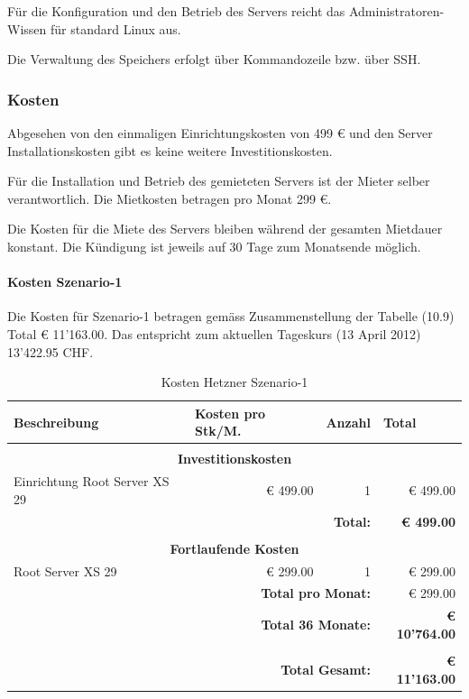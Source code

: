 Für die Konfiguration und den Betrieb des Servers reicht das Administratoren-Wissen für standard Linux aus.

Die Verwaltung des Speichers erfolgt über Kommandozeile bzw. über \gls{SSH}.

\subsubsection*{Kosten}
Abgesehen von den einmaligen Einrichtungskosten von 499 € und den Server Installationskosten gibt es keine weitere Investitionskosten. 

Für die Installation und Betrieb des gemieteten Servers ist der Mieter selber verantwortlich. Die Mietkosten betragen pro Monat 299 €.

Die Kosten für die Miete des Servers bleiben während der gesamten Mietdauer konstant. Die Kündigung ist jeweils auf 30 Tage zum Monatsende möglich. 

\paragraph*{Kosten Szenario-1}
Die Kosten für Szenario-1 betragen gemäss Zusammenstellung der Tabelle (10.9) Total € 11'163.00. Das entspricht zum aktuellen Tageskurs (13 April 2012) 13'422.95 CHF.

\begin{table}[htbp]
\caption{Kosten Hetzner Szenario-1}
\begin{small}
\begin{tabular}{|l|r|r|r|}
\hline
\textbf{Beschreibung} & \multicolumn{1}{l|}{\textbf{Kosten pro Stk/M.}} & \multicolumn{1}{l|}{\textbf{Anzahl}} & \multicolumn{1}{l|}{\textbf{Total}} \\ \hline
 \multicolumn{ 4}{c}{} \\ \hline
\multicolumn{ 4}{|c|}{\textbf{Investitionskosten}} \\ \hline
Einrichtung Root Server XS 29 & € 499.00 & 1 & € 499.00 \\ \hline \hline
 \multicolumn{ 3}{r|}{\textbf{Total:}} & \textbf{€ 499.00} \\ 
 \cline{4-4}
\multicolumn{ 4}{c}{} \\ \hline
\multicolumn{ 4}{|c|}{\textbf{Fortlaufende Kosten}} \\ \hline
Root Server XS 29 & € 299.00 & 1 & € 299.00 \\ \hline \hline
 \multicolumn{ 3}{r|}{\textbf{Total pro Monat:}} & € 299.00 \\
\cline{4-4}
 \multicolumn{ 3}{r|}{\textbf{Total 36 Monate:}} & \textbf{€ 10'764.00} \\ \cline{4-4}
 \multicolumn{ 4}{c}{} \\ \cline{4-4}
 \multicolumn{ 3}{r|}{\textbf{Total Gesamt:}} & \textbf{€ 11'163.00} \\ \cline{4-4}
\end{tabular}
\end{small}
\label{KostenHetznerS1}
\end{table}


